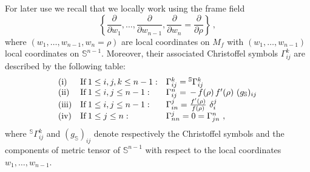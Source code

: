 \documentclass[11pt]{amsart}
\theoremstyle{plain}
\theoremstyle{definition}
\numberwithin{equation}{section}
\def \s{{\mathbb S}}
\numberwithin{equation}{section}
\begin{document}
For later use we recall that we locally work using the frame field 
\begin{equation}\label{eq:coordinate-field}
\left\{ \dfrac{\partial}{\partial w_1}, \dots, \dfrac{\partial}{\partial w_{n-1}}, \dfrac{\partial}{\partial w_{n}}=\dfrac{\partial}{\partial \rho}\right\}\,,
\end{equation}
where   $\left (w_1,\dots,w_{n-1}, w_n=\rho \right )$  are local coordinates on $M_f$ with  $\left (w_1,\dots,w_{n-1} \right )$  local coordinates  on $\s^{n-1}$. 
Moreover, their associated Christoffel symbols $\Gamma^k_{ij}$ are described by the following table:
\begin{equation}\label{simb-christ}
\begin{array}{lll}
{\rm (i)}&{\rm If}\, 1 \leq i,j,k \leq n-1: & \Gamma^k_{ij}={}^{\s}\Gamma^k_{ij} \\
{\rm (ii)}&{\rm If}\, 1 \leq i, j \leq n-1: & \Gamma^n_{ij}=\, -\,f(\rho)\,f'(\rho)\,\,(g_{\s})_{ij} \\
{\rm (iii)}&{\rm If}\, 1 \leq i,j \leq n-1: & \Gamma^j_{i n}=\frac{f'(\rho)}{f(\rho)} \,\,\delta_i^j \\
{\rm (iv)}&{\rm If}\, 1 \leq j \leq n: & \Gamma^j_{nn}=0=\Gamma^n_{jn} \,\,,\\
\end{array}
 \end{equation}
where ${}^{\s}\Gamma^k_{ij}$ and $(g_{\s})_{ij}$ denote respectively the Christoffel symbols and the components of metric tensor of $\s^{n-1}$ with respect to the local coordinates $w_1, \ldots,w_{n-1}$.
\end{document}
